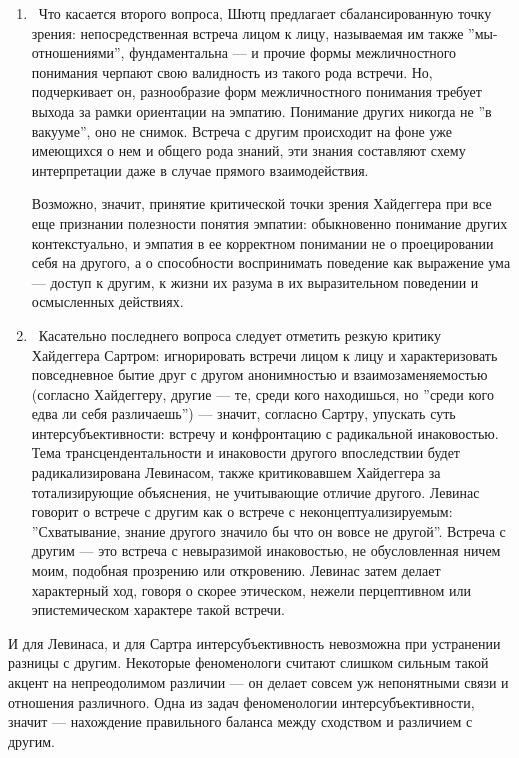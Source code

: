 \documentclass[11pt]{book}
\begin{document}
\begin{enumerate}
  \item\ Что касается второго вопроса, Шютц предлагает сбалансированную точку зрения: непосредственная встреча лицом к лицу, называемая им также ''мы-отношениями'', фундаментальна --- и прочие формы межличностного понимания черпают свою валидность из такого рода встречи. Но, подчеркивает он, разнообразие форм межличностного понимания требует выхода за рамки ориентации на эмпатию. Понимание других никогда не ''в вакууме'', оно не снимок. Встреча с другим происходит на фоне уже имеющихся о нем и общего рода знаний, эти знания составляют схему интерпретации даже в случае прямого взаимодействия.

Возможно, значит, принятие критической точки зрения Хайдеггера при все еще признании полезности понятия эмпатии: обыкновенно понимание других контекстуально, и эмпатия в ее корректном понимании не о проецировании себя на другого, а о способности воспринимать поведение как выражение ума --- доступ к другим, к жизни их разума в их выразительном поведении и осмысленных действиях.

  \item\ Касательно последнего вопроса следует отметить резкую критику Хайдеггера Сартром: игнорировать встречи лицом к лицу и характеризовать повседневное бытие друг с другом анонимностью и взаимозаменяемостью (согласно Хайдеггеру, другие --- те, среди кого находишься, но ''среди кого едва ли себя различаешь'') --- значит, согласно Сартру, упускать суть интерсубъективности: встречу и конфронтацию с радикальной инаковостью. Тема трансцендентальности и инаковости другого впоследствии будет радикализирована Левинасом, также критиковавшем Хайдеггера за тотализирующие объяснения, не учитывающие отличие другого. Левинас говорит о встрече с другим как о встрече с неконцептуализируемым: ''Схватывание, знание другого значило бы что он вовсе не другой''. Встреча с другим --- это встреча с невыразимой инаковостью, не обусловленная ничем моим, подобная прозрению или откровению. Левинас затем делает характерный ход, говоря о скорее этическом, нежели перцептивном или эпистемическом характере такой встречи.

\end{enumerate}

И для Левинаса, и для Сартра интерсубъективность невозможна при устранении разницы с другим. Некоторые феноменологи считают слишком сильным такой акцент на непреодолимом различии --- он делает совсем уж непонятными связи и отношения различного. Одна из задач феноменологии интерсубъективности, значит --- нахождение правильного баланса между сходством и различием с другим.
\end{document}
